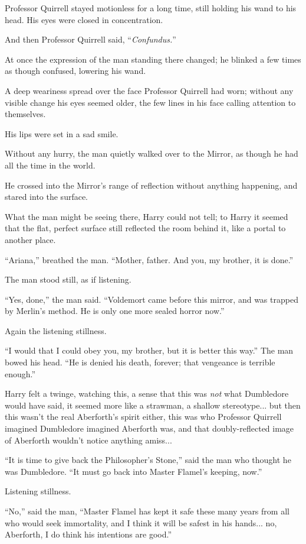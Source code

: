 Professor Quirrell stayed motionless for a long time, still holding his wand to his head. His eyes were closed in concentration.

And then Professor Quirrell said, ``\emph{Confundus.}''

At once the expression of the man standing there changed; he blinked a few times as though confused, lowering his wand.

A deep weariness spread over the face Professor Quirrell had worn; without any visible change his eyes seemed older, the few lines in his face calling attention to themselves.

His lips were set in a sad smile.

Without any hurry, the man quietly walked over to the Mirror, as though he had all the time in the world.

He crossed into the Mirror's range of reflection without anything happening, and stared into the surface.

What the man might be seeing there, Harry could not tell; to Harry it seemed that the flat, perfect surface still reflected the room behind it, like a portal to another place.

``Ariana,'' breathed the man. ``Mother, father. And you, my brother, it is done.''

The man stood still, as if listening.

``Yes, done,'' the man said. ``Voldemort came before this mirror, and was trapped by Merlin's method. He is only one more sealed horror now.''

Again the listening stillness.

``I would that I could obey you, my brother, but it is better this way.'' The man bowed his head. ``He is denied his death, forever; that vengeance is terrible enough.''

Harry felt a twinge, watching this, a sense that this was \emph{not} what Dumbledore would have said, it seemed more like a strawman, a shallow stereotype... but then this wasn't the real Aberforth's spirit either, this was who Professor Quirrell imagined Dumbledore imagined Aberforth was, and that doubly-reflected image of Aberforth wouldn't notice anything amiss...

``It is time to give back the Philosopher's Stone,'' said the man who thought he was Dumbledore. ``It must go back into Master Flamel's keeping, now.''

Listening stillness.

``No,'' said the man, ``Master Flamel has kept it safe these many years from all who would seek immortality, and I think it will be safest in his hands... no, Aberforth, I do think his intentions are good.''

